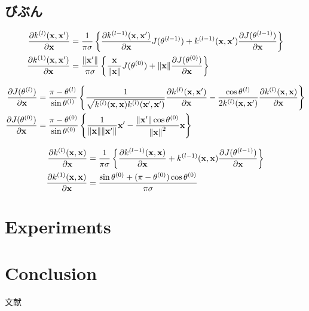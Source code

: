 \documentclass[11pt,a4j]{article}
\begin{document}
    \subsection{びぶん}
      \begin{align}
        \frac{\partial k^{(l)}({\bf x}, {\bf x}')}{\partial {\bf x}} &= 
        \frac{1}{\pi \sigma} \left\{ \frac{\partial k^{(l-1)}({\bf x}, {\bf x}')}{\partial {\bf x}} J(\theta^{(l-1)}) + k^{(l-1)}({\bf x}, {\bf x}') \frac{\partial J(\theta^{(l-1)})}{\partial {\bf x}} \right\} \\
        \frac{\partial k^{(1)}({\bf x}, {\bf x}')}{\partial {\bf x}} &= \frac{\| {\bf x}' \|}{\pi \sigma} \left\{ \frac{\bf x}{\| {\bf x} \|} J(\theta^{(0)}) + \|{\bf x}\| \frac{\partial J(\theta^{(0)})}{\partial {\bf x}} \right\}
      \end{align}

      \begin{align}
        \frac{\partial J(\theta^{(l)})}{\partial {\bf x}} &= \frac{ \pi - \theta^{(l)}}{ \sin \theta^{(l)}} \left\{ \frac{1}{\sqrt{k^{(l)}({\bf x}, {\bf x}) k^{(l)}({\bf x}', {\bf x}') }} \frac{\partial k^{(l)}({\bf x}, {\bf x}')}{\partial {\bf x}} - \frac{\cos \theta^{(l)}}{2 k^{(l)}({\bf x}, {\bf x}')} \frac{\partial k^{(l)}({\bf x}, {\bf x})}{\partial {\bf x}} \right\} \\
        \frac{\partial J(\theta^{(0)})}{\partial {\bf x}} &= \frac{ \pi - \theta^{(0)}}{ \sin \theta^{(0)}} \left\{ \frac{1}{ \|{\bf x}\| \|{\bf x}'\| } {\bf x}' - \frac{\|{\bf x}'\| \cos \theta^{(0)}}{{\|{\bf x}\|}^2} {\bf x} \right\}
      \end{align}

      \begin{align}
        \frac{\partial k^{(l)}({\bf x}, {\bf x})}{\partial {\bf x}} &= \frac{1}{\pi \sigma} \left\{ \frac{\partial k^{(l-1)}({\bf x}, {\bf x})}{\partial {\bf x}} + k^{(l-1)}({\bf x}, {\bf x}) \frac{\partial J(\theta^{(l-1)})}{\partial {\bf x}} \right\} \\
        \frac{\partial k^{(1)}({\bf x}, {\bf x})}{\partial {\bf x}} &= \frac{\sin \theta^{(0)} + (\pi - \theta^{(0)}) \cos \theta^{(0)} }{\pi \sigma}
      \end{align}

  \section{Experiments}
  \section{Conclusion}
    文献\cite{Hinton1995BayesianLF}
    \cite{DLGP2018} \cite{KMDL2009} \cite{LawrenceGPLVM2004} \cite{LawrenceGPLVM2005}
    \cite{SparseGP2006} \cite{VariationalSparseGP2009} \cite{BayesGP2010}
    \cite{GPBIGDATA2013}


  
\end{document}
